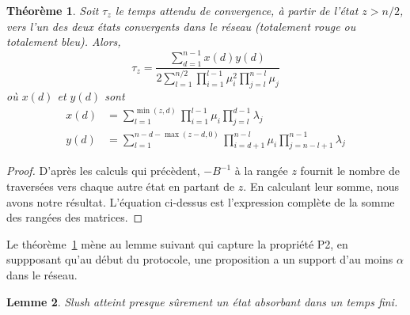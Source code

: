 \documentclass[letterpaper,twocolumn,10pt]{article}
\newcommand\ddfrac[2]{\frac{\displaystyle #1}{\displaystyle #2}}
\newtheorem{theorem}{Théorème}
\newtheorem{lemma}[theorem]{Lemme}
\theoremstyle{definition}
\begin{document}
\begin{appendices}
\begin{theorem}
\label{theorem:mean-convergence-time}
Soit $\tau_z$ le temps attendu de convergence, à partir de l'état $z > n/2$, vers l'un des deux états convergents dans le réseau (totalement rouge ou totalement bleu). Alors,
\begin{equation}
\tau_z = \ddfrac{\sum_{d = 1}^{n-1}x(d)y(d)}{2\sum_{l = 1}^{n/2}\prod_{i=1}^{l-1}\mu_i^2\prod_{j=l}^{n-l}\mu_j}
\end{equation}
où $x(d)$ et $y(d)$ sont
\begin{equation}
\begin{split}
x(d) &= \sum_{l = 1}^{\min(z, d)} \prod_{i=1}^{l-1} \mu_i \prod_{j = l}^{d-1} \lambda_j\\
y(d) &= \sum_{l = 1}^{n - d - \max(z-d, 0)} \prod_{i = d+1}^{n-l} \mu_i \prod_{j = n - l + 1}^{n - 1} \lambda_j
\end{split}
\end{equation}
\end{theorem}

\begin{proof}
D'après les calculs qui précèdent, $-B^{-1}$ à la rangée $z$ fournit le nombre de traversées vers chaque autre état en partant de $z$. En calculant leur somme, nous avons notre résultat. L'équation ci-dessus est l'expression complète de la somme des rangées des matrices.
\end{proof}

Le théorème~\ref{theorem:mean-convergence-time} mène au lemme suivant qui capture la propriété P2, en suppposant qu'au début du protocole, une proposition a un support d'au moins $\alpha$ dans le réseau.
\begin{lemma}
Slush atteint presque sûrement un état absorbant dans un temps fini.
\label{lemma:finitetermination}
\end{lemma}


\end{appendices}
\end{document}

